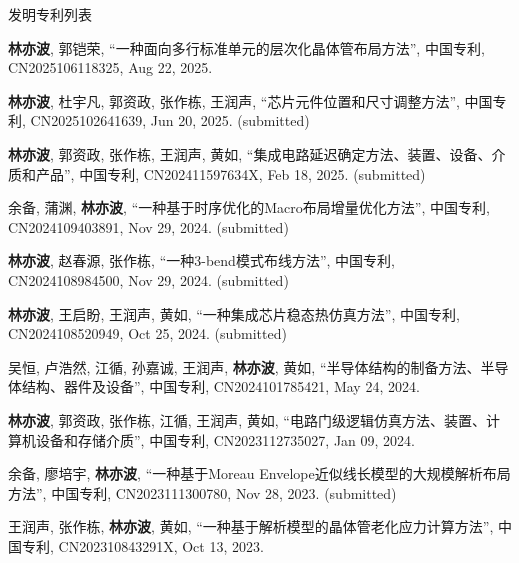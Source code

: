 \begin{rSection}{发明专利列表}
\begin{description}[font=\normalfont, rightmargin=2em]
\item[{[P24]}]{
        \textbf{林亦波}, 郭铠荣, 
    ``一种面向多行标准单元的层次化晶体管布局方法'', 
    中国专利, CN2025106118325, Aug 22, 2025.
    
}
            

\item[{[P23]}]{
        \textbf{林亦波}, 杜宇凡, 郭资政, 张作栋, 王润声, 
    ``芯片元件位置和尺寸调整方法'', 
    中国专利, CN2025102641639, Jun 20, 2025.
    (submitted)
}
            

\item[{[P22]}]{
        \textbf{林亦波}, 郭资政, 张作栋, 王润声, 黄如, 
    ``集成电路延迟确定方法、装置、设备、介质和产品'', 
    中国专利, CN202411597634X, Feb 18, 2025.
    (submitted)
}
            

\item[{[P21]}]{
        余备, 蒲渊, \textbf{林亦波}, 
    ``一种基于时序优化的Macro布局增量优化方法'', 
    中国专利, CN2024109403891, Nov 29, 2024.
    (submitted)
}
            

\item[{[P20]}]{
        \textbf{林亦波}, 赵春源, 张作栋, 
    ``一种3-bend模式布线方法'', 
    中国专利, CN2024108984500, Nov 29, 2024.
    (submitted)
}
            

\item[{[P19]}]{
        \textbf{林亦波}, 王启盼, 王润声, 黄如, 
    ``一种集成芯片稳态热仿真方法'', 
    中国专利, CN2024108520949, Oct 25, 2024.
    (submitted)
}
            

\item[{[P18]}]{
        吴恒, 卢浩然, 江循, 孙嘉诚, 王润声, \textbf{林亦波}, 黄如, 
    ``半导体结构的制备方法、半导体结构、器件及设备'', 
    中国专利, CN2024101785421, May 24, 2024.
    
}
            

\item[{[P17]}]{
        \textbf{林亦波}, 郭资政, 张作栋, 江循, 王润声, 黄如, 
    ``电路门级逻辑仿真方法、装置、计算机设备和存储介质'', 
    中国专利, CN2023112735027, Jan 09, 2024.
    
}
            

\item[{[P16]}]{
        余备, 廖培宇, \textbf{林亦波}, 
    ``一种基于Moreau Envelope近似线长模型的大规模解析布局方法'', 
    中国专利, CN2023111300780, Nov 28, 2023.
    (submitted)
}
            

\item[{[P15]}]{
        王润声, 张作栋, \textbf{林亦波}, 黄如, 
    ``一种基于解析模型的晶体管老化应力计算方法'', 
    中国专利, CN202310843291X, Oct 13, 2023.
    
}
\end{description}
\end{rSection}
